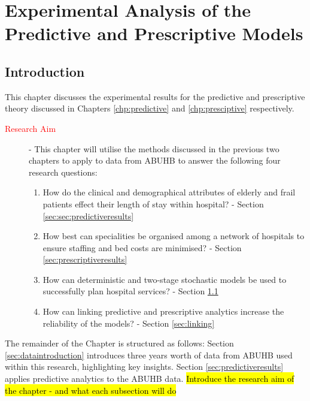 \documentclass[../thesis.tex]{subfiles}
\begin{document}
\chapter{Experimental Analysis of the Predictive and Prescriptive Models}\label{chp:Experimental Analysis}
\section{Introduction}
This chapter discusses the experimental results for the predictive and prescriptive theory discussed in Chapters \ref{chp:predictive} and \ref{chp:presciptive} respectively.

\begin{description}
\item[\textcolor{red}{Research Aim}] - This chapter will utilise the methods discussed in the previous two chapters to apply to data from ABUHB to answer the following four research questions:
\begin{enumerate}
    \item How do the clinical and demographical attributes of elderly and frail patients effect their length of stay within hospital? - Section \ref{sec:sec:predictiveresults}
    \item How best can specialities be organised among a network of hospitals to ensure staffing and bed costs are minimised? - Section \ref{sec:prescriptiveresults}
    \item How can deterministic and two-stage stochastic models be used to successfully plan hospital services? - Section \ref{}%
    \item How can linking predictive and prescriptive analytics increase the reliability of the models? - Section \ref{sec:linking}
\end{enumerate}
\end{description}

The remainder of the Chapter is structured as follows: Section \ref{sec:dataintroduction} introduces three years worth of data from ABUHB used within this research, highlighting key insights. Section \ref{sec:predictiveresults} applies predictive analytics to the ABUHB data.
\hl{Introduce the research aim of the chapter - and what each subsection will do}
\end{document}
